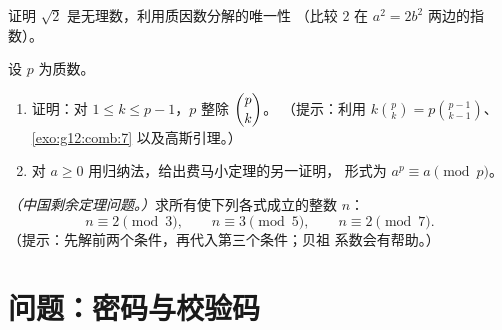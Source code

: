 \begin{exercise}[$\star\star$]\label{exo:g12:arith:8}
证明 $\sqrt2$ 是无理数，利用质因数分解的唯一性
（比较 $2$ 在 $a^2 = 2b^2$ 两边的指数）。
\end{exercise}

\begin{exercise}[$\star\star\star$]\label{exo:g12:arith:9}
设 $p$ 为质数。
\begin{enumerate}
  \item 证明：对 $1 \leq k \leq p - 1$，$p$ 整除 $\dbinom{p}{k}$。
        （提示：利用 $k\binom pk = p\binom{p-1}{k-1}$、\cref{exo:g12:comb:7}
        以及高斯引理。）
  \item 对 $a \geq 0$ 用归纳法，给出费马小定理的另一证明，
        形式为 $a^p \equiv a \pmod p$。
\end{enumerate}
\end{exercise}

\begin{exercise}[$\star\star\star$]\label{exo:g12:arith:10}
\emph{（中国剩余定理问题。）}求所有使下列各式成立的整数 $n$：
\[
n \equiv 2 \pmod 3, \qquad n \equiv 3 \pmod 5, \qquad n \equiv 2 \pmod 7 .
\]
（提示：先解前两个条件，再代入第三个条件；贝祖
系数会有帮助。）
\end{exercise}

\section{问题：密码与校验码}

